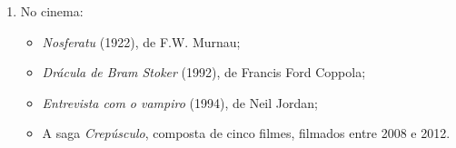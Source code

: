 \documentclass{extarticle}
\begin{document}
\begin{enumerate}
\begin{enumerate}
\begin{itemize}
\end{itemize}

\item No cinema: 
\begin{itemize}
\item \emph{Nosferatu} (1922), de F.W. Murnau; 


\item \emph{Drácula de Bram Stoker} (1992), de Francis Ford Coppola; 

\item \emph{Entrevista com o vampiro} (1994), de Neil Jordan; 

\item A saga \emph{Crepúsculo}, composta de cinco filmes, filmados entre 2008 e 2012.
\end{itemize}
\end{enumerate}
\end{enumerate}
\end{document}
